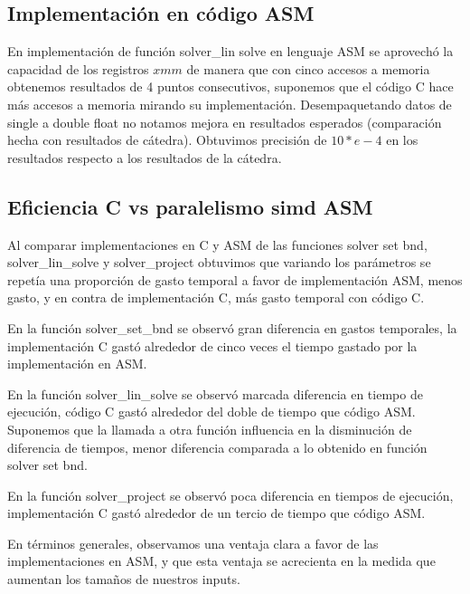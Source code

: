 
\subsection{Implementación en código ASM}
\par En implementación de función solver\_lin solve en lenguaje ASM se aprovechó la capacidad de los registros $xmm$ de manera que con cinco accesos a memoria obtenemos resultados de 4 puntos consecutivos, suponemos que el código C hace más accesos a memoria mirando su implementación. Desempaquetando datos de single a double float no notamos mejora en resultados esperados (comparación hecha con resultados de cátedra). Obtuvimos precisión de $10*e-4$ en los resultados respecto a los resultados de la cátedra. 

\subsection{Eficiencia C vs paralelismo simd ASM}
Al comparar implementaciones en C y ASM de las funciones solver set bnd, solver\_lin\_solve y solver\_project obtuvimos que variando los parámetros se repetía una proporción de gasto temporal a favor de implementación ASM, menos gasto, y en contra de implementación C, más gasto temporal con código C.\newline


\par En la función solver\_set\_bnd se observó gran diferencia en gastos temporales, la implementación C gastó alrededor de cinco veces el tiempo gastado por la implementación en ASM.\newline
\par En la función solver\_lin\_solve se observó marcada diferencia en tiempo de ejecución, código C gastó alrededor del doble de tiempo que código ASM. Suponemos que la llamada a otra función influencia en la disminución de diferencia de tiempos, menor diferencia comparada a lo obtenido en función solver set bnd.
\par En la función solver\_project se observó poca diferencia en tiempos de ejecución, implementación C gastó alrededor de un tercio de tiempo que código ASM.
\par En términos generales, observamos una ventaja clara a favor de las implementaciones en ASM, y que esta ventaja se acrecienta en la medida que aumentan los tamaños de nuestros inputs.\\